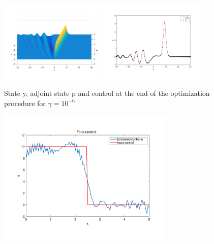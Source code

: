
\begin{figure}[!h]
 \includegraphics[width = 0.45\textwidth]{images/ex1recoveredstate3d.pdf}
  \includegraphics[width = 0.45\textwidth]{images/ex1recoveredstate.pdf}
 \caption{State y, adjoint state p and control at the end of the optimization procedure for $\gamma = 10^{-6}$}
\end{figure}

\begin{figure}[!h]
 \includegraphics[width = 0.75\textwidth]{images/ex1recoveredcontrol.pdf}
 \caption{}
\end{figure}

